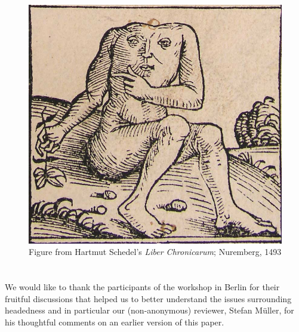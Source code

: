 \documentclass[output=paper
  ,nobabel
  ,draftmode
  ,colorlinks, citecolor=brown
]{langscibook}
\begin{document}
  
\begin{figure}
\includegraphics[width=.6\textwidth]{Figures/nuremberg-chronicles-strange-people-headless.jpg}
 
\caption{Figure from Hartmut Schedel's \emph{Liber Chronicarum}; Nuremberg, 1493}\label{fig-headless}
\end{figure}


\section*{\acknowledgmentsEN}

\largerpage
We would like to thank the participants of the workshop in Berlin for their fruitful discussions
that helped us to better understand the issues surrounding headedness and in particular our
(non-anonymous) reviewer, Stefan Müller, for his thoughtful comments on an earlier version of this
paper. 


\nocite{chapters/lander,chapters/salzmann,chapters/mueller,chapters/demske,chapters/korth,chapters/haider,chapters/raffelsiefen,chapters/noel,chapters/buecker,chapters/nolda}


\newpage

{\sloppy
\printbibliography[heading=subbibliography,notkeyword=this]
}
\end{document}
